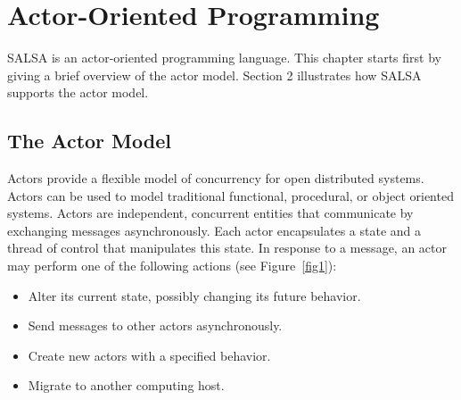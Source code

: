  
\chapter{Actor-Oriented Programming}\label{Actor-Oriented Programming}
SALSA is an actor-oriented programming language. This chapter starts 
first by giving a brief overview of the actor model. Section 2 
illustrates how SALSA supports the actor model.

\section{The Actor Model}\label{The Actor Model}
Actors \cite{agha-actors-86,hewitt-actors-77} provide a flexible model of concurrency for open 
distributed systems. Actors can be used to model traditional functional, 
procedural, or object oriented systems. Actors are independent, 
concurrent entities that communicate by exchanging messages 
asynchronously. Each actor encapsulates a state and a thread of 
control that manipulates this state. In response to a message, 
an actor may perform one of the following actions (see Figure~\ref{fig1}):
\begin{itemize}
\item Alter its current state, possibly changing its future behavior.
\item Send messages to other actors asynchronously.
\item Create new actors with a specified behavior.
\item Migrate to another computing host.
\end{itemize}

